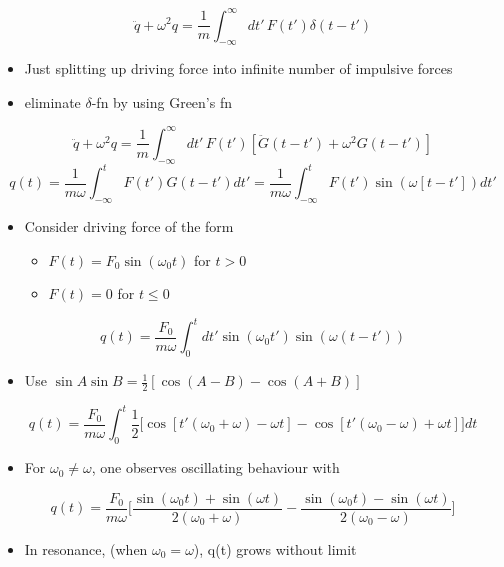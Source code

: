 \documentclass[a4paper,11pt,normalem]{article}
\begin{document}
\[
    \ddot{q} + \omega^{2}q = \frac{1}{m}\int_{-\infty}^{\infty} dt'\,F(t')\delta(t - t')
\]

\begin{itemize}
\item
  Just splitting up driving force into infinite number of impulsive
  forces
\item
  eliminate \(\delta\)-fn by using Green's fn
\end{itemize}

\[
    \ddot{q} + \omega^{2}q = \frac{1}{m}\int_{-\infty}^{\infty} dt'\,F(t')[\ddot{G}(t - t') + \omega^{2}G(t - t')] \]
\[
    q(t) = \frac{1}{m\omega} \int_{-\infty}^{t} F(t')G(t - t')dt' = \frac{1}{m\omega} \int_{-\infty}^{t} F(t')\sin(\omega[t - t'])dt'
\]

\begin{example}
\begin{itemize}
\item
  Consider driving force of the form
  \begin{itemize}
  \item
    \(F(t) = F_{0}\sin(\omega_{0}t)\) for \(t > 0\)
  \item
    \(F(t) = 0\) for \(t \leq 0\)
  \end{itemize}
\end{itemize}

\[
    q(t) = \frac{F_0}{m\omega}\int_{0}^{t} dt' \sin(\omega_{0}t')\sin(\omega(t - t'))
\]

\begin{itemize}
\item
  Use \(\sin A \sin B = \frac{1}{2} [\cos(A - B) - \cos(A + B)]\)
\end{itemize}

\[
    q(t) = \frac{F_0}{m\omega}\int_{0}^{t} \frac{1}{2}\Big[\cos[t'(\omega_{0} + \omega) - \omega t] - \cos[t'(\omega_{0} - \omega) + \omega t] \Big]dt
\]

\begin{itemize}
\item
  For \(\omega_{0} \neq \omega\), one observes oscillating behaviour
  with
\end{itemize}

\[
    q(t) = \frac{F_0}{m\omega}\Big[\frac{\sin(\omega_{0}t) + \sin(\omega t)}{2(\omega_{0} + \omega)} - \frac{\sin(\omega_{0}t) - \sin(\omega t)}{2(\omega_{0} - \omega)} \Big]
\]

\begin{itemize}
\item
  In resonance, (when \(\omega_{0} = \omega\)), q(t) grows without limit
\end{itemize}


\end{example}
\end{document}

